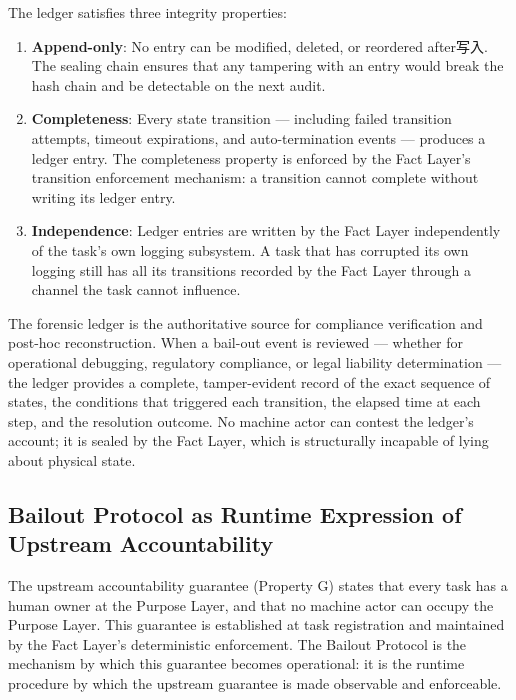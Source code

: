 The ledger satisfies three integrity properties:

\begin{enumerate}
\item \textbf{Append-only}: No entry can be modified, deleted, or reordered after写入. The sealing chain ensures that any tampering with an entry would break the hash chain and be detectable on the next audit.

\item \textbf{Completeness}: Every state transition — including failed transition attempts, timeout expirations, and auto-termination events — produces a ledger entry. The completeness property is enforced by the Fact Layer's transition enforcement mechanism: a transition cannot complete without writing its ledger entry.

\item \textbf{Independence}: Ledger entries are written by the Fact Layer independently of the task's own logging subsystem. A task that has corrupted its own logging still has all its transitions recorded by the Fact Layer through a channel the task cannot influence.
\end{enumerate}

The forensic ledger is the authoritative source for compliance verification and post-hoc reconstruction. When a bail-out event is reviewed — whether for operational debugging, regulatory compliance, or legal liability determination — the ledger provides a complete, tamper-evident record of the exact sequence of states, the conditions that triggered each transition, the elapsed time at each step, and the resolution outcome. No machine actor can contest the ledger's account; it is sealed by the Fact Layer, which is structurally incapable of lying about physical state.

\subsection{Bailout Protocol as Runtime Expression of Upstream Accountability}
\label{sec:upstream-guarantee}

The upstream accountability guarantee (Property G) states that every task has a human owner at the Purpose Layer, and that no machine actor can occupy the Purpose Layer. This guarantee is established at task registration and maintained by the Fact Layer's deterministic enforcement. The Bailout Protocol is the mechanism by which this guarantee becomes operational: it is the runtime procedure by which the upstream guarantee is made observable and enforceable.

